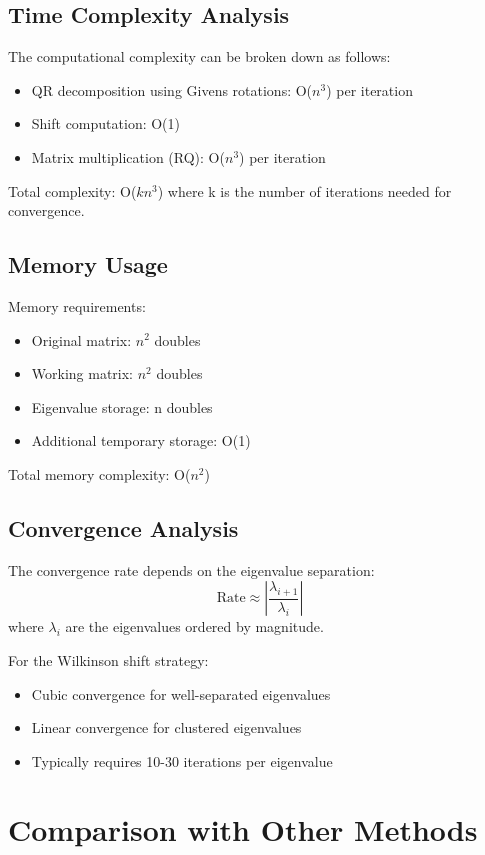 \documentclass{article}
\begin{document}
\subsection{Time Complexity Analysis}
The computational complexity can be broken down as follows:

\begin{itemize}
    \item QR decomposition using Givens rotations: O($n^3$) per iteration
    \item Shift computation: O(1)
    \item Matrix multiplication (RQ): O($n^3$) per iteration
\end{itemize}

Total complexity: O($kn^3$) where k is the number of iterations needed for convergence.

\subsection{Memory Usage}
Memory requirements:
\begin{itemize}
    \item Original matrix: $n^2$ doubles
    \item Working matrix: $n^2$ doubles
    \item Eigenvalue storage: n doubles
    \item Additional temporary storage: O(1)
\end{itemize}

Total memory complexity: O($n^2$)

\subsection{Convergence Analysis}
The convergence rate depends on the eigenvalue separation:
\[ \text{Rate} \approx \left|\frac{\lambda_{i+1}}{\lambda_i}\right| \]
where $\lambda_i$ are the eigenvalues ordered by magnitude.

For the Wilkinson shift strategy:
\begin{itemize}
    \item Cubic convergence for well-separated eigenvalues
    \item Linear convergence for clustered eigenvalues
    \item Typically requires 10-30 iterations per eigenvalue
\end{itemize}

\section{Comparison with Other Methods}
\end{document}
